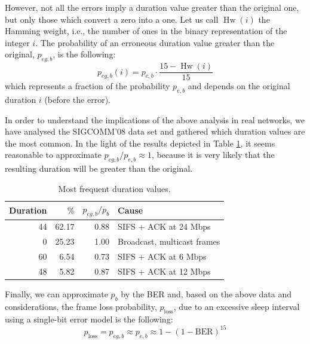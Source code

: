 \documentclass[twoside,nohyper]{tufte-book}
\theoremstyle{definition}
\theoremstyle{definition}
\theoremstyle{definition}
\theoremstyle{remark}
\begin{document}
However, not all the errors imply a duration value greater than the
original one, but only those which convert a zero into a one. Let us
call \(\operatorname{Hw}(i)\) the Hamming weight, i.e., the number of
ones in the binary representation of the integer \(i\). The probability
of an erroneous duration value greater than the original, \(p_{eg,b}\),
is the following:
%
\begin{equation}
 p_{eg,b}(i) = p_{e,b}\cdot \frac{15 -\operatorname{Hw}(i)}{15}
 \label{eq:pegb}
\end{equation}
%
which represents a fraction of the probability \(p_{e,b}\) and depends
on the original duration \(i\) (before the error).

In order to understand the implications of the above analysis in real
networks, we have analysed the SIGCOMM'08 data
set\cite[0pt]{umd-sigcomm2008-2009-03-02}
and gathered which duration values are the most common. In the light of
the results depicted in Table \ref{tab:duration}, it seems reasonable to
approximate \(p_{eg,b}/p_{e,b} \approx 1\), because it is very likely
that the resulting duration will be greater than the original.

\begin{table}

\begin{center}
\begin{tabular}{rrrl}
\toprule
Duration & $\%$ & $p_{eg,b}/p_b$ & Cause\\
\midrule
44 & 62.17 & 0.88 & SIFS + ACK at 24 Mbps\\
0 & 25.23 & 1.00 & Broadcast, multicast frames\\
60 & 6.54 & 0.73 & SIFS + ACK at 6 Mbps\\
48 & 5.82 & 0.87 & SIFS + ACK at 12 Mbps\\
\bottomrule
\end{tabular}
\end{center}
\caption{\label{tab:duration}Most frequent duration values.}
\end{table}

Finally, we can approximate \(p_b\) by the BER and, based on the above
data and considerations, the frame loss probability,
\(p_{\mathrm{loss}}\), due to an excessive sleep interval using a
single-bit error model is the following:
%
\begin{equation}
 p_{\mathrm{loss}} = p_{eg,b} \approx p_{e,b} \approx 1 - (1 - \mathrm{BER})^{15}
 \label{eq:plossbit}
\end{equation}
%
\end{document}
